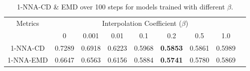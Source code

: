 \begin{table}
\centering
\vspace{-6mm}
\small
{
\caption{1-NNA-CD \& EMD over 100 steps for models trained with different $\beta$.
%
} %
\label{tab:beta_comp}
\begin{tabular}{c|cccccccc}
\toprule
\multirow{2}{*}{Metrics} & \multicolumn{7}{c}{Interpolation Coefficient ($\beta$)}                                                   \\
                         & 0        & 0.001    & 0.01     & 0.1      & 0.2      & 0.5         & 1.0      \\  \hline
1-NNA-CD                 & 0.7289 & 0.6918 & 0.6223 & 0.5968 & \textbf{0.5853} & 0.5861 & 0.5989 \\
1-NNA-EMD                & 0.6647 & 0.6563 & 0.6156 & 0.5884 & \textbf{0.5741} & 0.5780 & 0.5869 \\
\bottomrule
\end{tabular}
}
\end{table}
